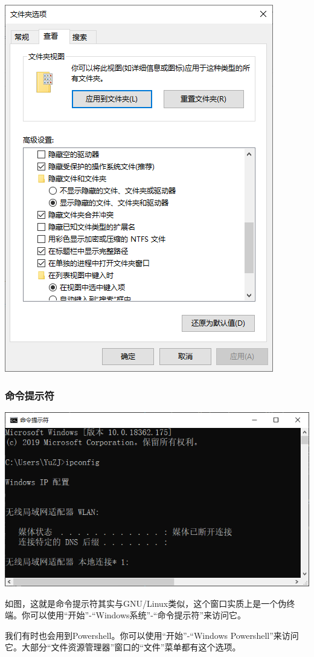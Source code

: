 \begin{center}
	\includegraphics[scale=0.8]{pic/expset}
\end{center} \par
\subsubsection{命令提示符}
\begin{center}
	\includegraphics[scale=0.8]{pic/cmd}
\end{center} \par
如图，这就是命令提示符其实与GNU/Linux类似，这个窗口实质上是一个伪终端。你可以使用“开始”-“Windows系统”-“命令提示符”来访问它。\par
我们有时也会用到Powershell。你可以使用“开始”-“Windows Powershell”来访问它。大部分“文件资源管理器”窗口的“文件”菜单都有这个选项。
